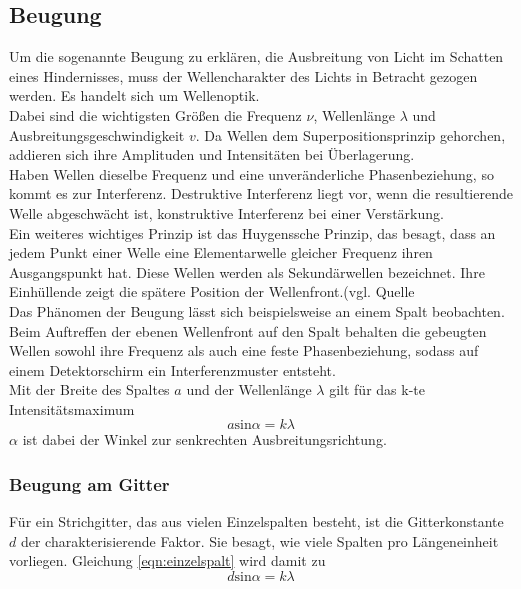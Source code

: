 \subsection{Beugung}
Um die sogenannte Beugung zu erklären, die Ausbreitung von Licht im 
Schatten eines Hindernisses, muss der Wellencharakter des Lichts in 
Betracht gezogen werden. Es handelt sich um Wellenoptik.\\
Dabei sind die wichtigsten Größen die Frequenz $\nu$, Wellenlänge $\lambda$
und Ausbreitungsgeschwindigkeit $v$. Da Wellen dem Superpositionsprinzip
gehorchen, addieren sich ihre Amplituden und Intensitäten bei Überlagerung.
\\
Haben Wellen dieselbe Frequenz und eine unveränderliche Phasenbeziehung,
so kommt es zur Interferenz. Destruktive Interferenz liegt vor, wenn die 
resultierende Welle abgeschwächt ist, konstruktive Interferenz bei einer
Verstärkung. \\
Ein weiteres wichtiges Prinzip ist das Huygenssche Prinzip, das besagt, dass
an jedem Punkt einer Welle eine Elementarwelle gleicher Frequenz ihren Ausgangspunkt
hat. Diese Wellen werden als Sekundärwellen bezeichnet. Ihre Einhüllende
zeigt die spätere Position der Wellenfront.(vgl. Quelle %
\\
Das Phänomen der Beugung lässt sich beispielsweise an einem Spalt beobachten.
Beim Auftreffen der ebenen Wellenfront auf den Spalt behalten die gebeugten
Wellen sowohl ihre Frequenz als auch eine feste Phasenbeziehung, sodass auf einem
Detektorschirm ein Interferenzmuster entsteht.\\
Mit der Breite des Spaltes $a$ und der Wellenlänge $\lambda$ gilt für das 
k-te Intensitätsmaximum 
\begin{equation}
    a \text{sin} \alpha = k \lambda
    \label{eqn:einzelspalt}
\end{equation}
$\alpha$ ist dabei der Winkel zur senkrechten Ausbreitungsrichtung.

\subsubsection{Beugung am Gitter}
Für ein Strichgitter, das aus vielen Einzelspalten besteht, ist die Gitterkonstante $d$
der charakterisierende Faktor. Sie besagt, wie viele Spalten pro Längeneinheit 
vorliegen. Gleichung \eqref{eqn:einzelspalt} wird damit zu
\begin{equation}
    d \text{sin} \alpha = k \lambda
    \label{eqn:strichgitter}
\end{equation}